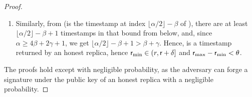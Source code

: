 \begin{proof}
\begin{enumerate}
		\item Similarly, from  (\rmin is the timestamp at index $\lfloor \alpha / 2 \rfloor - \beta$ of \txVotes), there are at least $\lfloor \alpha / 2 \rfloor - \beta + 1$ timestamps in \txVotes that bound \rmin from below, and, since $\alpha \geq 4\beta + 2 \gamma + 1$, we get $\lfloor \alpha / 2 \rfloor - \beta + 1 > \beta + \gamma$.
		Hence, \rmin is a timestamp returned by an honest replica, hence $\textsf{r}_\text{min} \in (r, \textsf{r} + \delta]$ and $\textsf{r}_\text{max} - \textsf{r}_\text{min} < \theta$.
	\end{enumerate}
	The proofs hold except with negligible probability, as the adversary can forge a signature under the public key of an honest replica with a negligible probability.
\end{proof}
